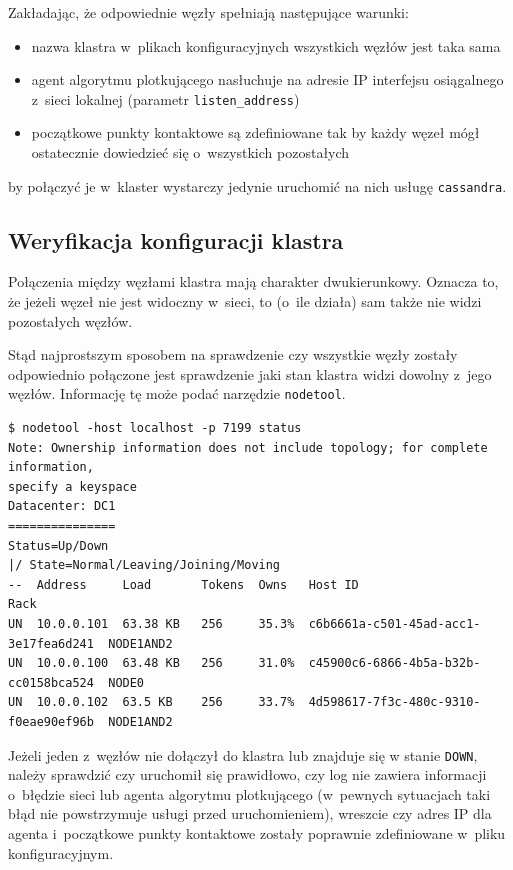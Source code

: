 \documentclass{article} %
\begin{document}
Zakładając, że odpowiednie węzły spełniają następujące warunki:

\begin{itemize}
\item nazwa klastra w~plikach konfiguracyjnych wszystkich węzłów jest taka sama
\item agent algorytmu plotkującego nasłuchuje na adresie IP interfejsu osiągalnego z~sieci lokalnej (parametr \texttt{listen\_address})
\item początkowe punkty kontaktowe są zdefiniowane tak by każdy węzeł mógł ostatecznie dowiedzieć się o~wszystkich pozostałych
\end{itemize}

by połączyć je w~klaster wystarczy jedynie uruchomić na nich usługę \texttt{cassandra}.

\subsection{Weryfikacja konfiguracji klastra}\label{subsec:cluster_verifying}

Połączenia między węzłami klastra mają charakter dwukierunkowy.
Oznacza to, że jeżeli węzeł nie jest widoczny w~sieci, to (o~ile działa) sam także nie widzi pozostałych węzłów.

Stąd najprostszym sposobem na sprawdzenie czy wszystkie węzły zostały odpowiednio połączone jest sprawdzenie jaki stan klastra widzi dowolny z~jego węzłów.
Informację tę może podać narzędzie \texttt{nodetool}.

\begin{lstlisting}[style=bash, caption={sprawdzanie stanu klastra po dołączeniu węzłów}]
$ nodetool -host localhost -p 7199 status
Note: Ownership information does not include topology; for complete information,
specify a keyspace
Datacenter: DC1
===============
Status=Up/Down
|/ State=Normal/Leaving/Joining/Moving
--  Address     Load       Tokens  Owns   Host ID                               Rack
UN  10.0.0.101  63.38 KB   256     35.3%  c6b6661a-c501-45ad-acc1-3e17fea6d241  NODE1AND2
UN  10.0.0.100  63.48 KB   256     31.0%  c45900c6-6866-4b5a-b32b-cc0158bca524  NODE0
UN  10.0.0.102  63.5 KB    256     33.7%  4d598617-7f3c-480c-9310-f0eae90ef96b  NODE1AND2
\end{lstlisting}

Jeżeli jeden z~węzłów nie dołączył do klastra lub znajduje się w stanie \texttt{DOWN}, należy sprawdzić czy uruchomił się prawidłowo, czy log nie zawiera informacji o~błędzie sieci lub agenta algorytmu plotkującego (w~pewnych sytuacjach taki błąd nie powstrzymuje usługi przed uruchomieniem), wreszcie czy adres IP dla agenta i~początkowe punkty kontaktowe zostały poprawnie zdefiniowane w~pliku konfiguracyjnym.
\end{document}
